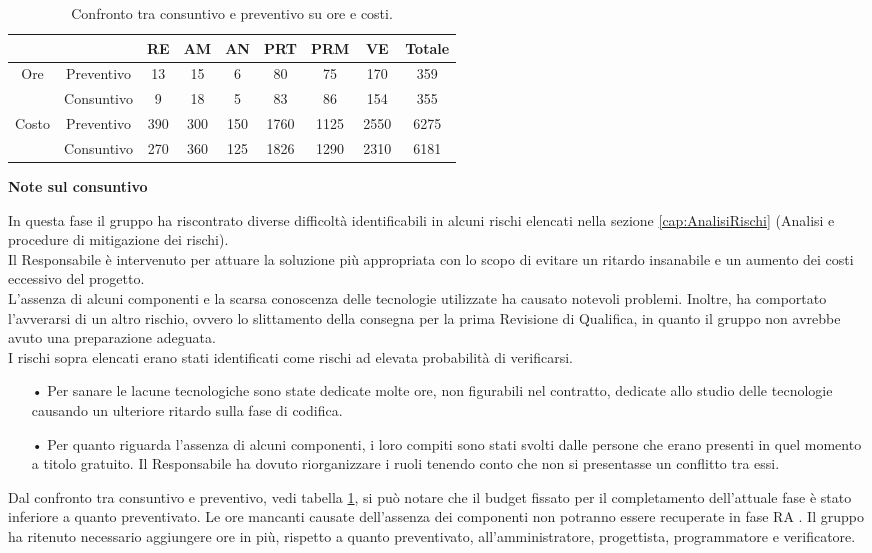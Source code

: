 {{\begin{table}[h!]
\begin{center}
\begin{tabular}{c| c c c c c c c |c }
				\toprule
				\multicolumn{2}{c}{}&	RE& AM& AN& PRT& PRM& VE& Totale \\ 
				\midrule
				\multirow{2}{*}{Ore}	& Preventivo	& 13& 15	& 6& 80 	& 75 & 170	& 359\\ 
							& Consuntivo	& 9 	& 18 	& 5	& 83 & 86 & 154	& 355\\ \hline
				\multirow{2}{*}{Costo}	& Preventivo	& 390	& 300	& 150 	& 1760 	& 1125 	& 2550	& 6275\\ 
							& Consuntivo	& 270	& 360 	& 125  & 1826 	& 1290	& 2310	& 6181\\
				\bottomrule
			\end{tabular}
		\end{center}
		\caption{Confronto tra consuntivo e preventivo su ore e costi.}
		\label{rc_RP-RQ}
	\end{table}

\textbf{Note sul consuntivo}{
 In questa fase il gruppo ha riscontrato diverse difficoltà identificabili in alcuni rischi elencati nella sezione \ref{cap:AnalisiRischi} (Analisi e procedure di mitigazione dei rischi).\\
Il Responsabile è intervenuto per attuare la soluzione più appropriata con lo scopo di evitare un ritardo insanabile e un aumento dei costi eccessivo del progetto.\\
L'assenza di alcuni componenti e la scarsa conoscenza delle tecnologie utilizzate ha causato notevoli problemi. Inoltre, ha comportato l'avverarsi di un altro rischio, ovvero lo slittamento della consegna per la prima Revisione di Qualifica, in quanto il gruppo non avrebbe avuto una preparazione adeguata.\\
I rischi sopra elencati erano stati identificati come rischi ad elevata probabilità di verificarsi.
\begin{itemize}
\item[•] Per sanare le lacune tecnologiche sono state dedicate molte ore, non figurabili nel contratto, dedicate allo studio delle tecnologie causando un ulteriore ritardo sulla fase di codifica.
\item[•] Per quanto riguarda l'assenza di alcuni componenti, i loro compiti sono stati svolti dalle persone che erano presenti in quel momento a titolo gratuito. Il Responsabile ha dovuto riorganizzare i ruoli tenendo conto che non si presentasse un conflitto tra essi.
\end{itemize}
Dal confronto tra consuntivo e preventivo, vedi tabella \ref{rc_RP-RQ}, si può notare che il budget fissato per il completamento dell'attuale fase è stato inferiore a quanto preventivato. Le ore mancanti causate dell'assenza dei componenti non potranno essere recuperate in fase RA . Il gruppo ha ritenuto necessario aggiungere ore in più, rispetto a quanto preventivato, all'amministratore, progettista, programmatore e verificatore.

}}}

